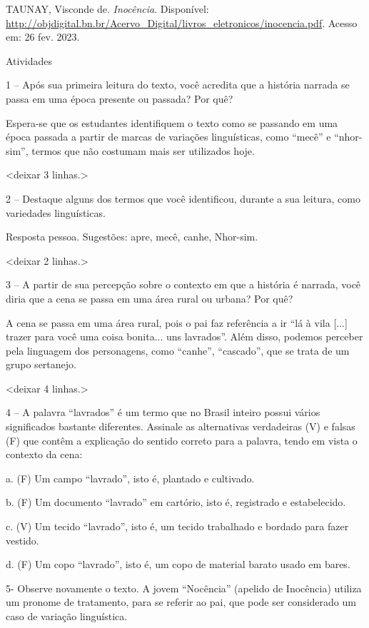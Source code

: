 TAUNAY, Visconde de. \emph{Inocência}. Disponível:
\url{http://objdigital.bn.br/Acervo_Digital/livros_eletronicos/inocencia.pdf}.
Acesso em: 26 fev. 2023.

Atividades

1 -- Após sua primeira leitura do texto, você acredita que a história
narrada se passa em uma época presente ou passada? Por quê?

Espera-se que os estudantes identifiquem o texto como se passando em uma
época passada a partir de marcas de variações linguísticas, como
``mecê'' e ``nhor-sim'', termos que não costumam mais ser utilizados
hoje.

\textless{}deixar 3 linhas.\textgreater{}

2 -- Destaque alguns dos termos que você identificou, durante a sua
leitura, como variedades linguísticas.

Resposta pessoa. Sugestões: apre, mecê, canhe, Nhor-sim.

\textless{}deixar 2 linhas.\textgreater{}

3 -- A partir de sua percepção sobre o contexto em que a história é
narrada, você diria que a cena se passa em uma área rural ou urbana? Por
quê?

A cena se passa em uma área rural, pois o pai faz referência a ir ``lá à
vila {[}...{]} trazer para você uma coisa bonita... uns lavrados''. Além
disso, podemos perceber pela linguagem dos personagens, como ``canhe'',
``cascado'', que se trata de um grupo sertanejo.

\textless{}deixar 4 linhas.\textgreater{}

4 -- A palavra ``lavrados'' é um termo que no Brasil inteiro possui
vários significados bastante diferentes. Assinale as alternativas
verdadeiras (V) e falsas (F) que contêm a explicação do sentido correto
para a palavra, tendo em vista o contexto da cena:

a. (F) Um campo ``lavrado'', isto é, plantado e cultivado.

b. (F) Um documento ``lavrado'' em cartório, isto é, registrado e
estabelecido.

c. (V) Um tecido ``lavrado'', isto é, um tecido trabalhado e bordado
para fazer vestido.

d. (F) Um copo ``lavrado'', isto é, um copo de material barato usado em
bares.

5- Observe novamente o texto. A jovem ``Nocência'' (apelido de
Inocência) utiliza um pronome de tratamento, para se referir ao pai, que
pode ser considerado um caso de variação linguística.

